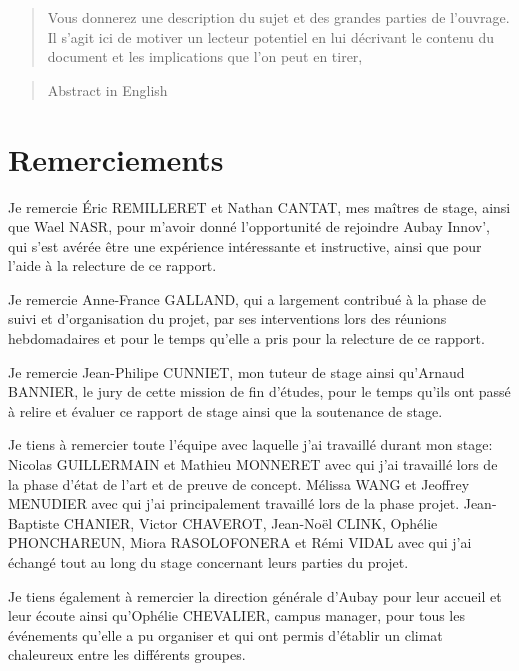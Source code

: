 \documentclass[11pt]{article}
\begin{document}
  \begin{abstract}
    Vous donnerez une description du
    sujet et des grandes parties de l’ouvrage. Il s’agit ici de motiver un lecteur potentiel en lui
    décrivant le contenu du document et les implications que l’on peut en tirer,
  \end{abstract}
  \pagebreak

  \begin{abstract}
    Abstract in English
  \end{abstract}
  \pagebreak

  \setcounter{tocdepth}{5}
  \tableofcontents

  \pagebreak

  \section{Remerciements}    
    Je remercie Éric REMILLERET et Nathan CANTAT, mes maîtres de stage, 
    ainsi que Wael NASR, pour m'avoir donné l'opportunité de rejoindre 
    Aubay Innov', qui s'est avérée être une expérience intéressante 
    et instructive, ainsi que pour l'aide à la relecture de ce rapport.    
    
    Je remercie Anne-France GALLAND, qui a largement contribué à la phase de suivi et d'organisation du projet, par ses interventions 
    lors des réunions hebdomadaires et pour le temps qu'elle a pris pour la relecture de ce rapport.    
    
    Je remercie Jean-Philipe CUNNIET, mon tuteur de stage ainsi qu'Arnaud BANNIER, le jury de cette mission de fin d'études, 
    pour le temps qu'ils ont passé à relire et évaluer ce rapport de stage ainsi que la soutenance de stage.    

    Je tiens à remercier toute l'équipe avec laquelle j'ai 
    travaillé durant mon stage:    
    Nicolas GUILLERMAIN et Mathieu MONNERET avec qui j'ai travaillé lors 
    de la phase d'état de l'art et de preuve de concept.
    Mélissa WANG et Jeoffrey MENUDIER avec qui j'ai principalement 
    travaillé lors de la phase projet. 
    Jean-Baptiste CHANIER, Victor CHAVEROT, Jean-Noël CLINK,
    Ophélie PHONCHAREUN, Miora RASOLOFONERA et Rémi VIDAL avec qui j'ai échangé tout au 
    long du stage concernant leurs parties du projet.       
    
    Je tiens également à remercier la direction générale d'Aubay pour leur accueil et leur écoute ainsi qu'Ophélie CHEVALIER, campus manager, 
    pour tous les événements qu'elle a pu organiser et qui ont permis d'établir un climat chaleureux entre les différents groupes.
        
\end{document}
